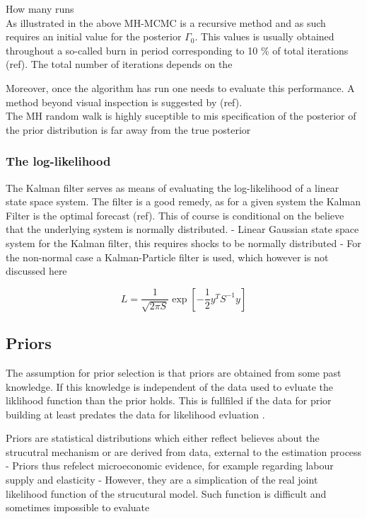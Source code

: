 \documentclass[11pt,a4paper,english]{article} %
\begin{document}
	How many runs\\
	

	As illustrated in the above MH-MCMC is a recursive method and as such requires an initial value for the posterior $\Gamma_0$. This values is usually obtained throughout a so-called burn in period corresponding to 10 \% of total iterations (ref). The total number of iterations depends on the 
	
	Moreover, once the algorithm has run one needs to evaluate this performance. A method beyond visual inspection is suggested by (ref).\\
	
	
	The MH random walk is highly suceptible to mis specification of the posterior of the prior distribution is far away from the true posterior \cite{herbst_bayesian_2014}
	
	
	
	
	
	\subsubsection{The log-likelihood}
	The Kalman filter serves as means of evaluating the log-likelihood of a linear state space system. The filter is a good remedy, as for a given system the Kalman Filter is the optimal forecast (ref). This of course is conditional on the believe that the underlying system is normally distributed.
	- Linear Gaussian state space system for the Kalman filter, this requires shocks to be normally distributed \cite{herbst_bayesian_2014}
	- For the non-normal case a Kalman-Particle filter is used, which however is not discussed here
	
	\[
		L = \frac{1}{\sqrt{2 \pi S}} \exp [- \frac{1}{2} y^T S^{-1} y]
	\]
	
	
	
	
	
	
	
	\subsection{Priors}
	
	The assumption for prior selection is that priors are obtained from some past knowledge. If this knowledge is independent of the data used to evluate the liklihood function than the prior holds. This is fullfiled if the data for prior building at least predates the data for likelihood evluation \cite{herbst_bayesian_2014}.
	
	
	Priors are statistical distributions which either reflect believes about the strucutral mechanism or are derived from data, external to the estimation process \cite{del_negro_forming_2008}
	- Priors thus refelect microeconomic evidence, for example regarding labour supply and elasticity
	- However, they are a simplication of the real joint likelihood function of the strucutural model. Such function is difficult and sometimes impossible to evaluate
	
\end{document}
